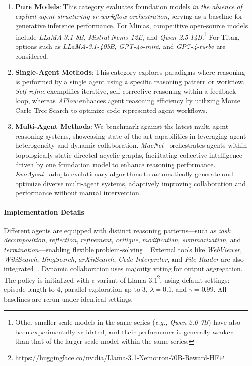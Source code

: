 \documentclass{article}
\newcommand{\eg}{\textit{e.g., }}
\begin{document}
\begin{enumerate}[$\bullet$]
\setlength{\topsep}{0pt}
\setlength{\itemsep}{0pt}
\item \textbf{Pure Models}: This category evaluates foundation models \emph{in the absence of explicit agent structuring or workflow orchestration}, serving as a baseline for generative inference performance. For Mimas, competitive open-source models include \emph{LLaMA-3.1-8B}, \emph{Mistral-Nemo-12B}, and \emph{Qwen-2.5-14B}.\footnote{Other smaller-scale models in the same series (\eg \emph{Qwen-2.0-7B}) have also been experimentally validated, and their performance is generally weaker than that of the larger-scale model within the same series.} For Titan, options such as \emph{LLaMA-3.1-405B}, \emph{GPT-4o-mini}, and \emph{GPT-4-turbo} are considered.
\item \textbf{Single-Agent Methods}: This category explores paradigms where reasoning is performed by a single agent using a specific reasoning pattern or workflow. \emph{Self-refine}\cite{madaan2023selfrefineiterativerefinementselffeedback} exemplifies iterative, self-corrective reasoning within a feedback loop, whereas \emph{AFlow}\cite{zhang2025aflowautomatingagenticworkflow} enhances agent reasoning efficiency by utilizing Monte Carlo Tree Search to optimize code-represented agent workflows.
\item \textbf{Multi-Agent Methods}: We benchmark against the latest multi-agent reasoning systems, showcasing state-of-the-art capabilities in leveraging agent heterogeneity and dynamic collaboration. \emph{MacNet}~\cite{qian2025scaling} orchestrates agents within topologically static directed acyclic graphs, facilitating collective intelligence driven by one foundation model to enhance reasoning performance. \emph{EvoAgent}~\cite{yuan2025evoagentautomaticmultiagentgeneration} adopts evolutionary algorithms to automatically generate and optimize diverse multi-agent systems, adaptively improving collaboration and performance without manual intervention.
\end{enumerate}

\paragraph{Implementation Details}
Different agents are equipped with distinct reasoning patterns—such as \emph{task decomposition}, \emph{reflection}, \emph{refinement}, \emph{critique}, \emph{modification}, \emph{summarization}, and \emph{termination}—enabling flexible problem-solving~\cite{qi2024mutualreasoningmakessmaller, hao2023reasoninglanguagemodelplanning, 10.5555/3692070.3694642, madaan2023selfrefineiterativerefinementselffeedback}. External tools like \emph{WebViewer}, \emph{WikiSearch}, \emph{BingSearch}, \emph{arXivSearch}, \emph{Code Interpreter}, and \emph{File Reader} are also integrated~\cite{qin2023toolllm}. Dynamic collaboration uses majority voting for output aggregation. The policy is initialized with a variant of Llama-3.1\footnote{\url{https://huggingface.co/nvidia/Llama-3.1-Nemotron-70B-Reward-HF}}, using default settings: episode length to 4, parallel exploration up to 3, $\lambda=0.1$, and $\gamma=0.99$. All baselines are rerun under identical settings.
\end{document}
